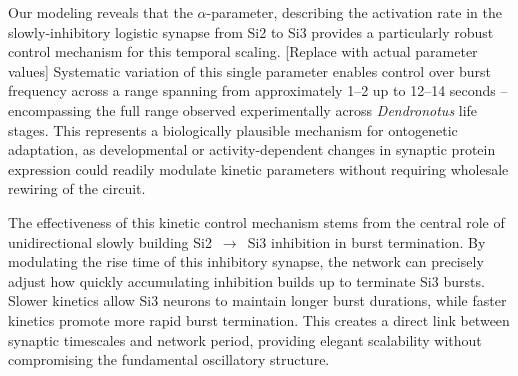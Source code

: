 \documentclass[nofootinbib,aip,amsmath,amssymb,reprint,twocolumn,10pt]{revtex4-2}
\begin{document}
Our modeling reveals that the $\alpha$-parameter, describing the activation rate in the slowly-inhibitory logistic synapse from Si2 to Si3 provides a particularly robust control mechanism for this temporal scaling. {\color{red}[Replace with actual parameter values]} Systematic variation of this single parameter enables control over burst frequency across a range spanning from approximately 1--2 up to 12--14 seconds -- encompassing the full range observed experimentally across \textit{Dendronotus} life stages. This represents a biologically plausible mechanism for ontogenetic adaptation, as developmental or activity-dependent changes in synaptic protein expression could readily modulate kinetic parameters without requiring wholesale rewiring of the circuit.

The effectiveness of this kinetic control mechanism stems from the central role of unidirectional slowly building  Si2~$\to$~Si3 inhibition in burst termination. By modulating the rise time of this inhibitory synapse, the network can precisely adjust how quickly accumulating inhibition builds up to terminate Si3 bursts. Slower kinetics allow Si3 neurons to maintain longer burst durations, while faster kinetics promote more rapid burst termination. This creates a direct link between synaptic timescales and network period, providing elegant scalability without compromising the fundamental oscillatory structure.
\end{document}
